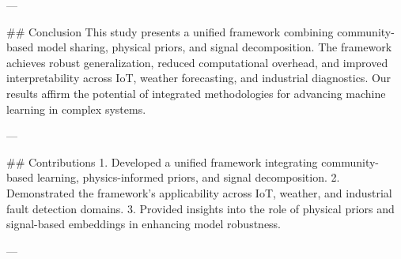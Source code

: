 ---

## Conclusion  
This study presents a unified framework combining community-based model sharing, physical priors, and signal decomposition. The framework achieves robust generalization, reduced computational overhead, and improved interpretability across IoT, weather forecasting, and industrial diagnostics. Our results affirm the potential of integrated methodologies for advancing machine learning in complex systems.

---

## Contributions  
1. Developed a unified framework integrating community-based learning, physics-informed priors, and signal decomposition.  
2. Demonstrated the framework's applicability across IoT, weather, and industrial fault detection domains.  
3. Provided insights into the role of physical priors and signal-based embeddings in enhancing model robustness.  

---